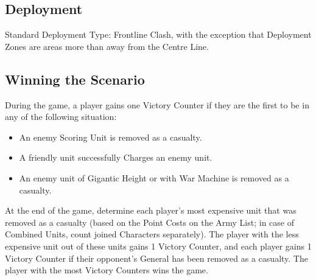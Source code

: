 
\label{AProperBattle}


\subsection*{Deployment}

Standard Deployment Type: Frontline Clash, with the exception that Deployment Zones are areas more than  away from the Centre Line.


\subsection*{Winning the Scenario}

During the game, a player gains one Victory Counter if they are the first to be in any of the following situation:
\begin{itemize}
\item An enemy Scoring Unit is removed as a casualty.
\item A friendly unit successfully Charges an enemy unit.
\item An enemy unit of Gigantic Height or with War Machine is removed as a casualty.
\end{itemize}

At the end of the game, determine each player's most expensive unit that was removed as a casualty (based on the Point Costs on the Army List; in case of Combined Units, count joined Characters separately). The player with the less expensive unit out of these units gains 1 Victory Counter, and each player gains 1 Victory Counter if their opponent's General has been removed as a casualty.\newline
The player with the most Victory Counters wins the game.
